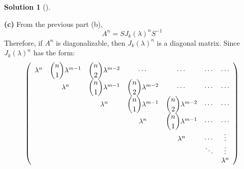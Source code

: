 \documentclass[numbers=enddot,12pt,final,onecolumn,notitlepage]{scrartcl}
\newcounter{sol}
\theoremstyle{definition}
\newtheorem{solu}[sol]{Solution}
\newenvironment{solution}[1][]
{\begin{solu}[#1]\begin{leftbar}}
        {\end{leftbar}\end{solu}}
\begin{document}
\begin{solution}
	\textbf{(c)} From the previous part (b),
	\[
		A^n = SJ_k(\lambda)^nS^{-1}
	\]
	Therefore, if $A^n$ is diagonalizable, then $J_k(\lambda)^n$ is a diagonal matrix. Since $J_k(\lambda)^n$ has the form:
	\[
		\left(
		\begin{array}
				[c]{ccccccc}%
				\lambda^{n} & \dbinom{n}{1}\lambda^{m-1} & \dbinom{n}{2}\lambda^{m-2} & \cdots                     & \cdots                     & \cdots & \cdots      \\
				            & \lambda^{n}                & \dbinom{n}{1}\lambda^{m-1} & \dbinom{n}{2}\lambda^{m-2} & \cdots                     & \cdots & \cdots      \\
				            &                            & \lambda^{n}                & \dbinom{n}{1}\lambda^{m-1} & \dbinom{n}{2}\lambda^{m-2} & \cdots & \cdots      \\
				            &                            &                            & \lambda^{n}                & \dbinom{n}{1}\lambda^{m-1} & \cdots & \cdots      \\
				            &                            &                            &                            & \lambda^{n}                & \cdots & \vdots      \\
				            &                            &                            &                            &                            & \ddots & \vdots      \\
				            &                            &                            &                            &                            &        & \lambda^{n}
			\end{array}
		\right)
	\]


\end{solution}
\end{document}
